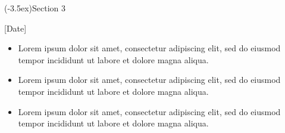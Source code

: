 \documentclass[11pt, a4paper, cvroundpic]{my-cv}
\begin{document}
  \CVSection[\faPencil*](-3.5ex){Section 3}

    [Date]
  	  \begin{itemize}
  	    \item Lorem ipsum dolor sit amet, consectetur adipiscing elit, sed do eiusmod tempor incididunt ut labore et dolore magna aliqua.
  	    \item Lorem ipsum dolor sit amet, consectetur adipiscing elit, sed do eiusmod tempor incididunt ut labore et dolore magna aliqua.
  	    \item Lorem ipsum dolor sit amet, consectetur adipiscing elit, sed do eiusmod tempor incididunt ut labore et dolore magna aliqua.
  	  \end{itemize}
\end{document}
